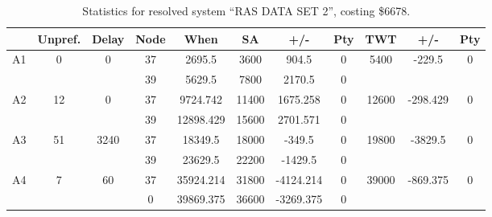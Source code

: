 \begin{sidewaystable}
\footnotesize
\caption{Statistics for resolved system ``RAS DATA SET 2'', costing \$6678.}
\centering
\begin{tabular}{c||c|c||c|c|c|c|c||c|c|c}
  \hline \hline
  &
  Unpref. & 
  Delay &
  Node &
  When &
  SA &
  +/- &
  Pty &
  TWT &
  +/- &
  Pty \\
      \hline
      \multirow{2}{*}{A1} &
      \multirow{2}{*}{0} &
      \multirow{2}{*}{0} &
      37 &
      2695.5 &
      3600 &
        904.5 &
        0 &
      \multirow{2}{*}{5400} &
        \multirow{2}{*}{-229.5} &
        \multirow{2}{*}{0}
      \\
      \cline{4-8}
       &
       &
       &
      39 &
      5629.5 &
      7800 &
        2170.5 &
        0 &
      
         &
        
      \\
      \hline
      \multirow{2}{*}{A2} &
      \multirow{2}{*}{12} &
      \multirow{2}{*}{0} &
      37 &
      9724.742 &
      11400 &
        1675.258 &
        0 &
      \multirow{2}{*}{12600} &
        \multirow{2}{*}{-298.429} &
        \multirow{2}{*}{0}
      \\
      \cline{4-8}
       &
       &
       &
      39 &
      12898.429 &
      15600 &
        2701.571 &
        0 &
      
         &
        
      \\
      \hline
      \multirow{2}{*}{A3} &
      \multirow{2}{*}{51} &
      \multirow{2}{*}{3240} &
      37 &
      18349.5 &
      18000 &
        -349.5 &
        0 &
      \multirow{2}{*}{19800} &
        \multirow{2}{*}{-3829.5} &
        \multirow{2}{*}{0}
      \\
      \cline{4-8}
       &
       &
       &
      39 &
      23629.5 &
      22200 &
        -1429.5 &
        0 &
      
         &
        
      \\
      \hline
      \multirow{2}{*}{A4} &
      \multirow{2}{*}{7} &
      \multirow{2}{*}{60} &
      37 &
      35924.214 &
      31800 &
        -4124.214 &
        0 &
      \multirow{2}{*}{39000} &
        \multirow{2}{*}{-869.375} &
        \multirow{2}{*}{0}
      \\
      \cline{4-8}
       &
       &
       &
      0 &
      39869.375 &
      36600 &
        -3269.375 &
        0 &
      

\end{tabular}
\end{sidewaystable}
